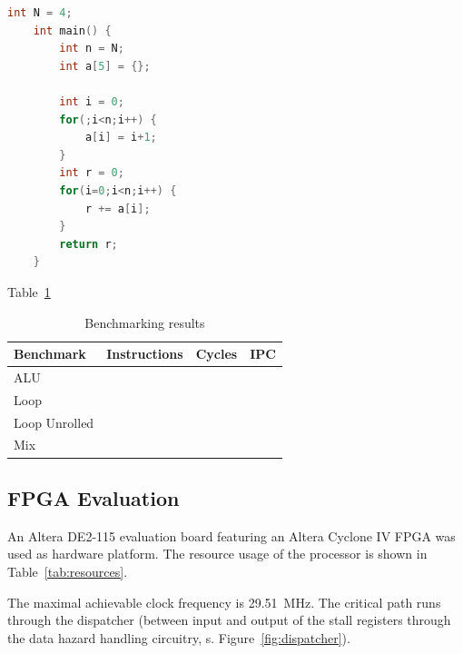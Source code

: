 \documentclass[conference]{IEEEtran}
\begin{document}
\begin{lstlisting}[language=C, caption=Code for the loop benchmark]
	int N = 4;
	int main() {
		int n = N;
		int a[5] = {};

		int i = 0;
		for(;i<n;i++) {
			a[i] = i+1;
		}
		int r = 0;
		for(i=0;i<n;i++) {
			r += a[i];
		}
		return r;
	}
\end{lstlisting}





Table~\ref{tab:results}

\begin{table} [h]
	\caption{Benchmarking results}
	\centering
	\begin{tabular}{l c c c}
			Benchmark & Instructions & Cycles & IPC \\
		\midrule
			ALU & & & \\
			Loop & & & \\
			Loop Unrolled & & & \\
			Mix & & & 
	\end{tabular}
	\label{tab:results}
\end{table}



\subsection{FPGA Evaluation}

An Altera DE2-115 evaluation board featuring an Altera Cyclone IV FPGA was used as hardware platform. The resource usage of the processor is shown in Table~\ref{tab:resources}. %

The maximal achievable clock frequency is \SI{29.51}{\MHz}. The critical path runs through the dispatcher (between input and output of the stall registers through the data hazard handling circuitry, s. Figure~\ref{fig:dispatcher}). %
\end{document}
